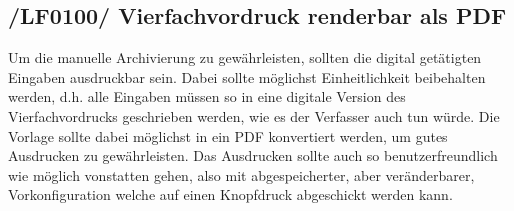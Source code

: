 \subsection{/LF0100/ Vierfachvordruck renderbar als PDF}
Um die manuelle Archivierung zu gewährleisten, sollten die digital getätigten Eingaben ausdruckbar sein. Dabei sollte möglichst Einheitlichkeit beibehalten werden, d.h. alle Eingaben müssen so in eine digitale Version des Vierfachvordrucks geschrieben werden, wie es der Verfasser auch tun würde. Die Vorlage sollte dabei möglichst in ein PDF konvertiert werden, um gutes Ausdrucken zu gewährleisten. Das Ausdrucken sollte auch so benutzerfreundlich wie möglich vonstatten gehen, also mit abgespeicherter, aber veränderbarer, Vorkonfiguration welche auf einen Knopfdruck abgeschickt werden kann.
